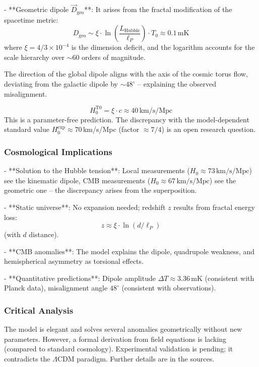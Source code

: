 - **Geometric dipole $\vec{D}_{\text{geo}}$**:
It arises from the fractal modification of the spacetime metric:
\[
D_{\text{geo}} \sim \xi \cdot \ln\left(\frac{L_{\text{Hubble}}}{\ell_P}\right) \cdot T_0 \approx 0.1\,\text{mK}
\]
where $\xi = 4/3 \times 10^{-4}$ is the dimension deficit, and the logarithm accounts for the scale hierarchy over $\sim 60$ orders of magnitude.

The direction of the global dipole aligns with the axis of the cosmic torus flow, deviating from the galactic dipole by $\sim 48^\circ$ – explaining the observed misalignment.

\[
H_0^{\text{T0}} = \xi \cdot c \approx 40\,\text{km/s/Mpc}
\]
This is a parameter-free prediction. The discrepancy with the model-dependent standard value $H_0^{\text{exp}} \approx 70\,$km/s/Mpc (factor $\approx 7/4$) is an open research question.

\subsubsection{Cosmological Implications}

- **Solution to the Hubble tension**: Local measurements ($H_0 \approx 73\,\text{km/s/Mpc}$) see the kinematic dipole, CMB measurements ($H_0 \approx 67\,\text{km/s/Mpc}$) see the geometric one – the discrepancy arises from the superposition.

- **Static universe**: No expansion needed; redshift $z$ results from fractal energy loss:
\[
z \approx \xi \cdot \ln(d / \ell_P)
\]
(with $d$ distance).

- **CMB anomalies**: The model explains the dipole, quadrupole weakness, and hemispherical asymmetry as torsional effects.

- **Quantitative predictions**: Dipole amplitude $\Delta T \approx 3.36\,\text{mK}$ (consistent with Planck data), misalignment angle $48^\circ$ (consistent with observations).

\subsubsection{Critical Analysis}

The model is elegant and solves several anomalies geometrically without new parameters. However, a formal derivation from field equations is lacking (compared to standard cosmology). Experimental validation is pending; it contradicts the $\Lambda$CDM paradigm. Further details are in the sources.

